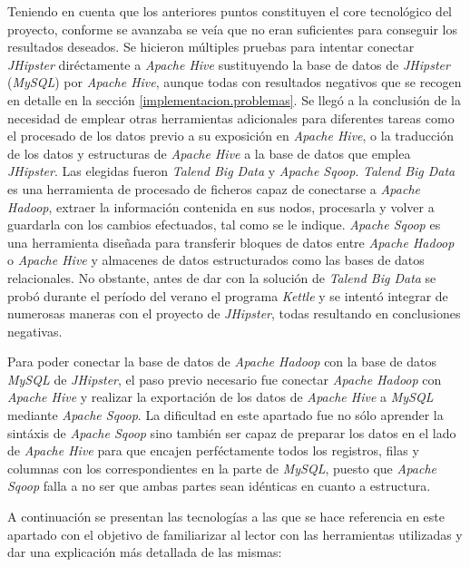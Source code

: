 	\par
	Teniendo en cuenta que los anteriores puntos constituyen el core tecnológico del proyecto, conforme se avanzaba se veía que no eran suficientes para conseguir los resultados deseados. Se hicieron múltiples pruebas para intentar conectar \textit{JHipster} diréctamente a \textit{Apache Hive} sustituyendo la base de datos de \textit{JHipster} (\textit{MySQL}) por \textit{Apache Hive}, aunque todas con resultados negativos que se recogen en detalle en la sección \ref{implementacion.problemas}. Se llegó a la conclusión de la necesidad de emplear otras herramientas adicionales para diferentes tareas como el procesado de los datos previo a su exposición en \textit{Apache Hive}, o la traducción de los datos y estructuras de \textit{Apache Hive} a la base de datos que emplea \textit{JHipster}. Las elegidas fueron \textit{Talend Big Data} y \textit{Apache Sqoop}. \textit{Talend Big Data} es una herramienta de procesado de ficheros capaz de conectarse a \textit{Apache Hadoop},  extraer la información contenida en sus nodos, procesarla y volver a guardarla con los cambios efectuados, tal como se le indique. \textit{Apache Sqoop} es una herramienta diseñada para transferir bloques de datos entre \textit{Apache Hadoop} o \textit{Apache Hive} y almacenes de datos estructurados como las bases de datos relacionales. No obstante, antes de dar con la solución de \textit{Talend Big Data} se probó durante el período del verano el programa \textit{Kettle} y se intentó integrar de numerosas maneras con el proyecto de \textit{JHipster}, todas resultando en conclusiones negativas.
	\par	
	Para poder conectar la base de datos de \textit{Apache Hadoop} con la base de datos \textit{MySQL} de \textit{JHipster}, el paso previo necesario fue conectar \textit{Apache Hadoop} con \textit{Apache Hive} y realizar la exportación de los datos de \textit{Apache Hive} a \textit{MySQL} mediante \textit{Apache Sqoop}. La dificultad en este apartado fue no sólo aprender la sintáxis de \textit{Apache Sqoop} sino también ser capaz de preparar los datos en el lado de \textit{Apache Hive} para que encajen perféctamente todos los registros, filas y columnas con los correspondientes en la parte de \textit{MySQL}, puesto que \textit{Apache Sqoop} falla a no ser que ambas partes sean idénticas en cuanto a estructura. \par
	A continuación se presentan las tecnologías a las que se hace referencia en este apartado con el objetivo de familiarizar al lector con las herramientas utilizadas y dar una explicación más detallada de las mismas:
